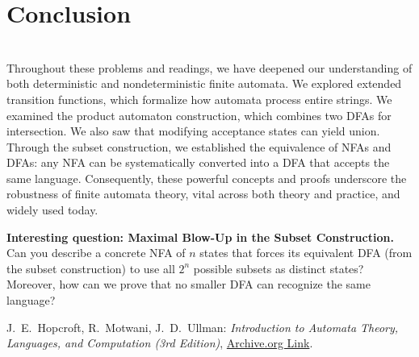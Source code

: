 \documentclass{article}
\theoremstyle{theorem}
\theoremstyle{definition}
\theoremstyle{remark}
\begin{document}
\newpage

\noindent
\section{Conclusion} \\
Throughout these problems and readings, we have deepened our understanding of both deterministic 
and nondeterministic finite automata. We explored extended transition functions, which formalize 
how automata process entire strings. We examined the product automaton construction, which 
combines two DFAs for intersection. We also saw that modifying acceptance states can yield union. 
Through the subset construction, we established the equivalence of NFAs and DFAs: any NFA can be 
systematically converted into a DFA that accepts the same language. Consequently, these powerful 
concepts and proofs underscore the robustness of finite automata theory, vital across both theory 
and practice, and widely used today.

\textbf{ Interesting question: Maximal Blow-Up in the Subset Construction.}\\
    Can you describe a concrete NFA of \(n\) states that forces its equivalent DFA 
    (from the subset construction) to use all \(2^n\) possible subsets as distinct states? 
    Moreover, how can we prove that no smaller DFA can recognize the same language?

\newpage

\begin{thebibliography}{99}

    \bibitem[HMU] 
    J.~E.~Hopcroft, R.~Motwani, J.~D.~Ullman: 
    \emph{Introduction to Automata Theory, Languages, and Computation (3rd Edition)}, 
    \href{https://archive.org/details/hopcroft-motwani-ullman-introduction-to-automata-theory-languages-and-computations-3rd-edition/page/65/mode/1up?view=theater}{Archive.org Link}.
    
\end{thebibliography}    
\end{document}
